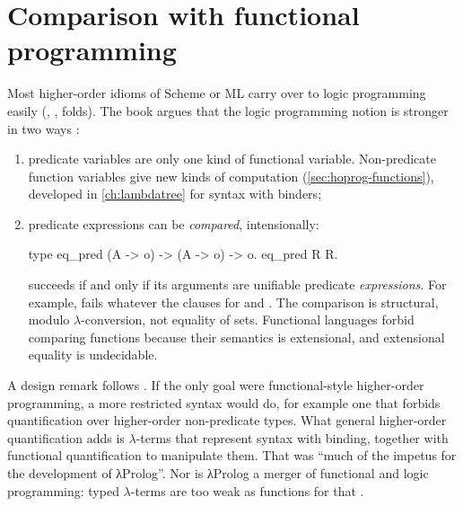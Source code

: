 \section{Comparison with functional programming}\label{sec:hoprog-fp}

Most higher-order idioms of Scheme or ML carry over to logic programming easily (,
, folds). The book argues that the logic programming notion is stronger in two ways
:
\begin{enumerate}
\item predicate variables are only one kind of functional variable. Non-\linebreak{}predicate function variables
  give new kinds of computation (\cref{sec:hoprog-functions}), developed in \cref{ch:lambdatree} for
  syntax with binders;
\item predicate expressions can be \emph{compared}, intensionally:
\begin{lprolog}
type eq_pred (A -> o) -> (A -> o) -> o.
eq_pred R R.
\end{lprolog}
  succeeds if and only if its arguments are unifiable predicate \emph{expressions}. For example,
   fails whatever the clauses for  and . The
  comparison is structural, modulo $\lambda$-conversion, not equality of sets. Functional languages forbid
  comparing functions because their semantics is extensional, and extensional equality is undecidable.
\end{enumerate}
A design remark follows . If the only goal were functional-style higher-order programming, a
more restricted syntax would do, for example one that forbids quantification over higher-order
non-predicate types. What general higher-order quantification adds is $\lambda$-terms that represent
syntax with binding, together with functional quantification to manipulate them. That was ``much of the
impetus for the development of λProlog''. Nor is λProlog a merger of functional and logic
programming: typed $\lambda$-terms are too weak as functions for that .

